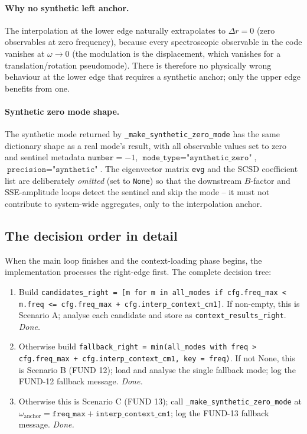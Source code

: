 \documentclass[10pt,a4paper,twoside]{article}
\newcommand{\fn}[1]{\texttt{#1}}
\newcommand{\cfgkey}[1]{\texttt{#1}}
\begin{document}
\paragraph{Why no synthetic left anchor.}
The interpolation at the lower edge naturally extrapolates to
$\Delta r = 0$ (zero observables at zero frequency), because every
spectroscopic observable in the code vanishes at $\omega \to 0$
(the modulation is the displacement, which vanishes for a
translation/rotation pseudomode). There is therefore no
physically wrong behaviour at the lower edge that requires a synthetic
anchor; only the upper edge benefits from one.

\paragraph{Synthetic zero mode shape.}
The synthetic mode returned by \fn{\_make\_synthetic\_zero\_mode} has
the same dictionary shape as a real mode's result, with all
observable values set to zero and sentinel metadata
$\texttt{number} = -1$,
$\texttt{mode\_type} = \texttt{"synthetic\_zero"}$,
$\texttt{precision} = \texttt{"synthetic"}$. The eigenvector
matrix \fn{evg} and the SCSD coefficient list are deliberately
\emph{omitted} (set to \texttt{None}) so that the downstream
$B$-factor and SSE-amplitude loops detect the sentinel and skip the
mode -- it must not contribute to system-wide aggregates, only to
the interpolation anchor.

\subsection{The decision order in detail}

When the main loop finishes and the context-loading phase begins,
the implementation processes the right-edge first. The complete
decision tree:

\begin{enumerate}
  \item Build \texttt{candidates\_right = [m for m in all\_modes if
        cfg.freq\_max < m.freq <= cfg.freq\_max +
        cfg.interp\_context\_cm1]}. If non-empty, this is
        Scenario A; analyse each candidate and store as
        \texttt{context\_results\_right}. \emph{Done.}
  \item Otherwise build \texttt{fallback\_right = min(all\_modes
        with freq > cfg.freq\_max + cfg.interp\_context\_cm1, key
        = freq)}. If not None, this is Scenario B (FUND 12);
        load and analyse the single fallback mode; log the
        FUND-12 fallback message. \emph{Done.}
  \item Otherwise this is Scenario C (FUND 13); call
        \fn{\_make\_synthetic\_zero\_mode} at
        $\omega_\text{anchor} = \cfgkey{freq\_max} +
        \cfgkey{interp\_context\_cm1}$;
        log the FUND-13 fallback message. \emph{Done.}
\end{enumerate}
\end{document}
